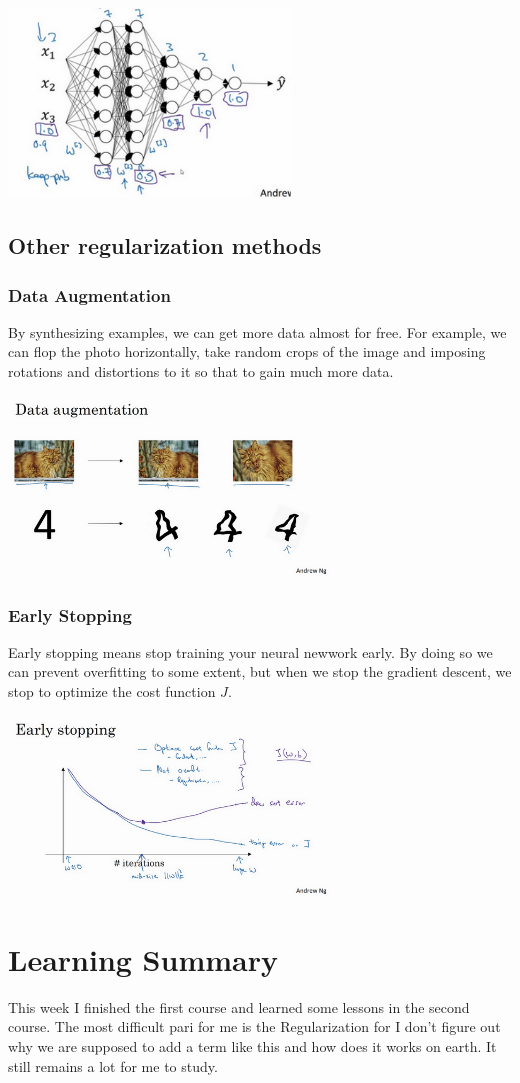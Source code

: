 \documentclass{article}
\begin{document}
\includegraphics[width=7.5cm]{dropout3.png}

\subsection{Other regularization methods}
\subsubsection{Data Augmentation}
By synthesizing examples, we can get more data almost for free. For example, we can flop the photo horizontally, take random crops of the image and imposing rotations and distortions to it so that to gain much more data.

\includegraphics[width=8.5cm]{data_augmentation.png}

\subsubsection{Early Stopping}

Early stopping means stop training your neural newwork early. By doing so we can prevent overfitting to some extent, but when we stop the gradient descent, we stop to optimize the cost function $J$.

\includegraphics[width=8.5cm]{early_stopping.png}



\section{Learning Summary}
This week I finished the first course and learned some lessons in the second course. The most difficult pari for me is the Regularization for I don't figure out why we are supposed to add a term like this and how does it works on earth. It still remains a lot for me to study.
\end{document}
